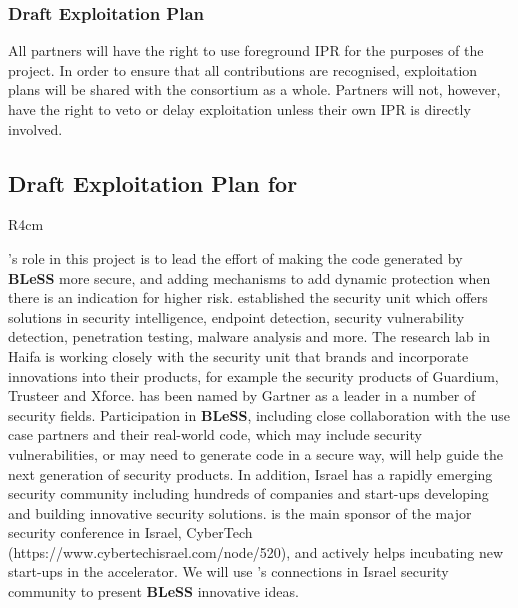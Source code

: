 \documentclass[a4paper,11pt]{article}
\newcommand{\project}[1]{\textbf{#1}\xspace}
\newcommand{\BLESS}{\project{BLeSS}}
\newcommand{\TheProject}{\BLESS}
\begin{document}
\subsubsection{Draft Exploitation Plan}
\label{sect:exploitation-plan}
\vspace{-12pt}

All partners will have the right to use foreground IPR for
the purposes of the project. In order to ensure that all
contributions are recognised, exploitation plans will be
shared with the consortium as a whole. Partners will not,
however, have the right to veto or delay exploitation
unless their own IPR is directly involved.


\horizontalline

\subsection*{Draft Exploitation Plan for \IBMshort{}}


\begin{wrapfigure}{R}{4cm}
\vspace{-1.4cm}
\hfill {}
\vspace{-0.6cm}
\end{wrapfigure}

\IBMshort{}'s role in this project is to lead the effort of making the
code generated by \TheProject{} more secure, and adding mechanisms to add
dynamic protection when there is an indication for higher risk.
\IBMshort{} established the \IBMshort{} security unit which offers
solutions in security intelligence, endpoint detection, security
vulnerability detection, penetration testing, malware analysis and more.
The \IBMshort{} research lab in Haifa is working closely with the \IBMshort{}
security unit that brands and incorporate innovations into their products, for
example the security products of Guardium, Trusteer and Xforce.
\IBMshort{} has been named by Gartner as a leader in a number of security
fields. Participation in \TheProject{}, including close collaboration
with the use case partners and their real-world code, which may include
security vulnerabilities, or may need to generate code in a secure way,
will help guide the next generation of security products.  In addition,
Israel has a rapidly emerging security community including hundreds of
companies and start-ups developing and building innovative security
solutions. \IBMshort{} is the main sponsor of the major security
conference in Israel, CyberTech
(https://www.cybertechisrael.com/node/520), and actively helps incubating
new start-ups in the \IBMshort{} accelerator. We will use \IBMshort{}'s
connections in Israel security community to present \TheProject{}
innovative ideas.
\end{document}
